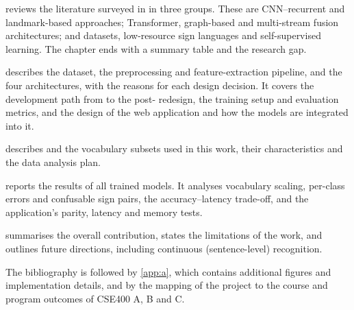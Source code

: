 \begin{description}[leftmargin=0pt, labelsep=0.5em, font=\normalfont\bfseries]
  \item[\Cref{ch:related}: Related Works] reviews the literature surveyed in
  \capA{} in three groups. These are CNN--recurrent and landmark-based
  approaches; Transformer, graph-based and multi-stream fusion
  architectures; and datasets, low-resource sign languages and
  self-supervised learning. The chapter ends with a summary table and the
  research gap.

  \item[\Cref{ch:method}: Materials and Method] describes the dataset, the
  preprocessing and feature-extraction pipeline, and the four
  architectures, with the reasons for each design decision. It covers the
  development path from \capB{} to the post-\capB{} redesign, the training
  setup and evaluation metrics, and the design of the web application and
  how the models are integrated into it.

  \item[\Cref{ch:data}: Data Description] describes \aslc{} and the
  vocabulary subsets used in this work, their characteristics and the data
  analysis plan.

  \item[\Cref{ch:results}: Results and Discussion] reports the results of
  all trained models. It analyses vocabulary scaling, per-class errors and
  confusable sign pairs, the accuracy--latency trade-off, and the
  application's parity, latency and memory tests.

  \item[\Cref{ch:conclusion}: Conclusion] summarises the overall
  contribution, states the limitations of the work, and outlines future
  directions, including continuous (sentence-level) recognition.
\end{description}

\noindent The bibliography is followed by \cref{app:a}, which contains
additional figures and implementation details, and by the mapping of the
project to the course and program outcomes of CSE400 A, B and C.
